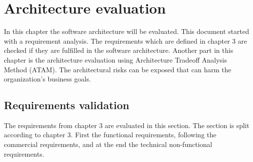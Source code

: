 \chapter{Architecture evaluation}
\label{ch:evaluation}
In this chapter the software architecture will be evaluated. This document started with a requirement analysis. The requirements which are defined in chapter 3 are checked if they are fulfilled in the software architecture. Another part in this chapter is the architecture evaluation using Architecture Tradeoff Analysis Method (ATAM). The architectural risks can be exposed that can harm the organization's business goals.

\section{Requirements validation}
The requirements from chapter 3 are evaluated in this section. The section is split according to chapter 3. First  the functional requirements, following the commercial requirements, and at the end the technical non-functional requirements.

